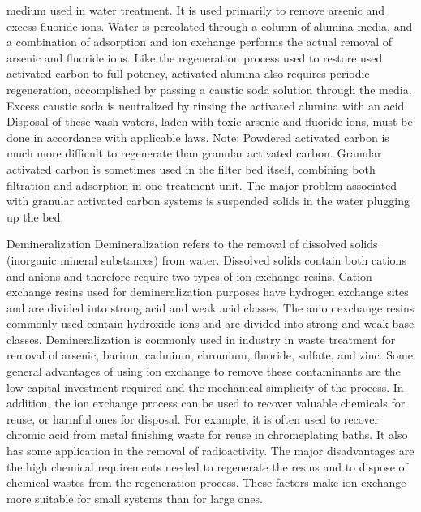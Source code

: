 \documentclass{article}
\begin{document}
medium used in water treatment. It is used primarily to remove arsenic
and excess fluoride ions. Water is percolated through a column of
alumina media, and a combination of adsorption and ion exchange performs
the actual removal of arsenic and fluoride ions. Like the regeneration
process used to restore used activated carbon to full potency, activated
alumina also requires periodic regeneration, accomplished by passing a
caustic soda solution through the media. Excess caustic soda is
neutralized by rinsing the activated alumina with an acid. Disposal of
these wash waters, laden with toxic arsenic and fluoride ions, must be
done in accordance with applicable laws. Note: Powdered activated carbon
is much more difficult to regenerate than granular activated carbon.
Granular activated carbon is sometimes used in the filter bed itself,
combining both filtration and adsorption in one treatment unit. The
major problem associated with granular activated carbon systems is
suspended solids in the water plugging up the bed.

Demineralization Demineralization refers to the removal of dissolved
solids (inorganic mineral substances) from water. Dissolved solids
contain both cations and anions and therefore require two types of ion
exchange resins. Cation exchange resins used for demineralization
purposes have hydrogen exchange sites and are divided into strong acid
and weak acid classes. The anion exchange resins commonly used contain
hydroxide ions and are divided into strong and weak base classes.
Demineralization is commonly used in industry in waste treatment for
removal of arsenic, barium, cadmium, chromium, fluoride, sulfate, and
zinc. Some general advantages of using ion exchange to remove these
contaminants are the low capital investment required and the mechanical
simplicity of the process. In addition, the ion exchange process can be
used to recover valuable chemicals for reuse, or harmful ones for
disposal. For example, it is often used to recover chromic acid from
metal finishing waste for reuse in chromeplating baths. It also has some
application in the removal of radioactivity. The major disadvantages are
the high chemical requirements needed to regenerate the resins and to
dispose of chemical wastes from the regeneration process. These factors
make ion exchange more suitable for small systems than for large ones.
\end{document}
